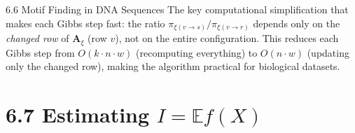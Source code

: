 \documentclass[aspectratio=169,10pt]{beamer}
\begin{document}
\begin{frame}[allowframebreaks]{6.6 Motif Finding in DNA Sequences}
The key computational simplification that makes each Gibbs step fast: the ratio $\pi_{\xi(v \to s)} / \pi_{\xi(v \to r)}$ depends only on the \emph{changed row} of $\mathbf{A}_\xi$ (row $v$), not on the entire configuration.
This reduces each Gibbs step from $O(k \cdot n \cdot w)$ (recomputing everything) to $O(n \cdot w)$ (updating only the changed row), making the algorithm practical for biological datasets.

\end{frame}

\section{6.7 Estimating $I = \mathbb{E}f(X)$}
\end{document}

